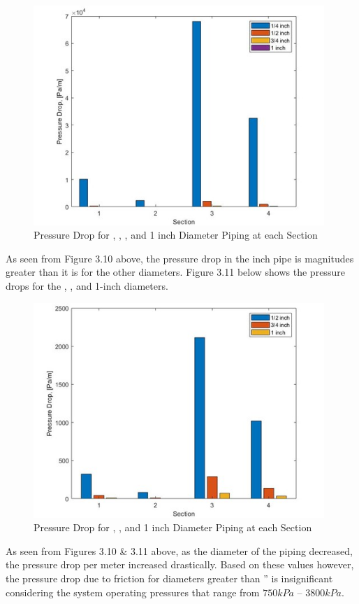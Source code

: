 \newpage
\begin{figure}[H]
    \centering
    \includegraphics[width=11cm]{images/pressure_drops.jpg}
    \caption{Pressure Drop for , , , and 1 inch Diameter Piping at each Section}
\end{figure}

\medskip
As seen from Figure 3.10 above, the pressure drop in the  inch pipe is magnitudes greater than it is for the other diameters. Figure 3.11 below shows the pressure drops for the , , and 1-inch diameters.

\medskip
\begin{figure}[H]
    \centering
    \includegraphics[width=11cm]{images/pressure_drops_new.jpg}
    \caption{Pressure Drop for , , and 1 inch Diameter Piping at each Section}
\end{figure}

\medskip
As seen from Figures 3.10 \& 3.11 above, as the diameter of the piping decreased, the pressure drop per meter increased drastically. Based on these values however, the pressure drop due to friction for diameters greater than ” is insignificant considering the system operating pressures that range from $750kPa$ – $3800kPa$.

